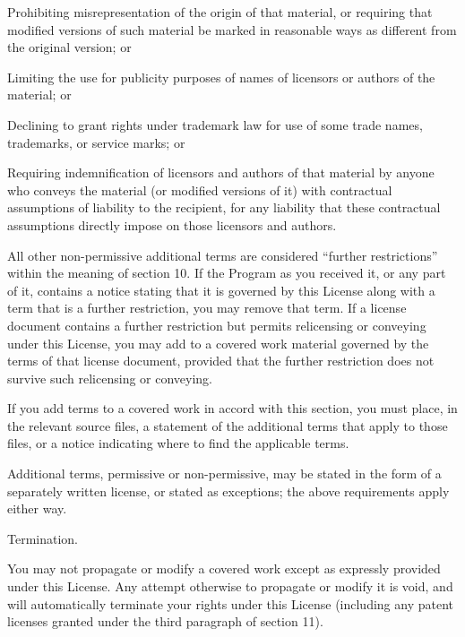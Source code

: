   \item Prohibiting misrepresentation of the origin of that material, or requiring that modified versions of such material be marked in reasonable ways as different from the original version; or

  \item Limiting the use for publicity purposes of names of licensors or authors of the material; or

  \item Declining to grant rights under trademark law for use of some trade names, trademarks, or service marks; or

  \item Requiring indemnification of licensors and authors of that material by anyone who conveys the material (or modified versions of it) with contractual assumptions of liability to the recipient, for any liability that these contractual assumptions directly impose on those licensors and authors.
  \stopitemize

All other non-permissive additional terms are considered ``further restrictions'' within the meaning of section 10.  If the Program as you received it, or any part of it, contains a notice stating that it is governed by this License along with a term that is a further restriction, you may remove that term.  If a license document contains a further restriction but permits relicensing or conveying under this License, you may add to a covered work material governed by the terms of that license document, provided that the further restriction does not survive such relicensing or conveying.

If you add terms to a covered work in accord with this section, you must place, in the relevant source files, a statement of the additional terms that apply to those files, or a notice indicating where to find the applicable terms.

Additional terms, permissive or non-permissive, may be stated in the form of a separately written license, or stated as exceptions; the above requirements apply either way.

\item Termination.

You may not propagate or modify a covered work except as expressly provided under this License.  Any attempt otherwise to propagate or modify it is void, and will automatically terminate your rights under this License (including any patent licenses granted under the third paragraph of section 11).


